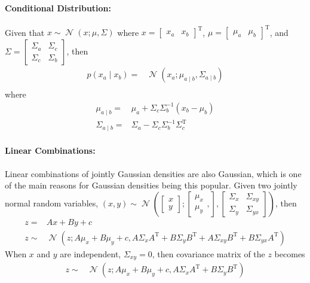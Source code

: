\documentclass[twoside]{article}
\newcommand{\N}{\operatorname{\mathcal{N}}}
\renewcommand{\t}{^\mathrm{T}{}}
\begin{document}
\paragraph{Conditional Distribution:}
Given that $x\sim\N(x;\mu,\Sigma)$ where
$x = \left[\begin{array}{cc}
	x_a & x_b
\end{array} \right]\t$, $
\mu = \left[\begin{array}{cc}
	\mu_a & \mu_b
\end{array} \right]\t $, and $
\Sigma = \left[\begin{array}{cc}
	\Sigma_a & \Sigma_c\\
	\Sigma_c & \Sigma_b
\end{array} \right] $, then
\begin{align*}
	p(x_a\mid x_b) =& \N(x_a;\mu_{a\mid b},\Sigma_{a\mid b})\\
\end{align*}
where
\begin{align*}
	\mu_{a \mid b} =& \mu_a + \Sigma_c \Sigma_b^{-1}(x_b-\mu_b)\\
	\Sigma_{a \mid b} =& \Sigma_a - \Sigma_c\Sigma_b^{-1}\Sigma_c\t 
\end{align*}
\paragraph{Linear Combinations:}
Linear combinations of jointly Gaussian densities are also Gaussian, which is one of the main reasons for Gaussian densities being this popular. Given two jointly normal random variables, $(x,y)\sim\N\left( \left[ \begin{array}{c}
	x\\y
\end{array}\right] ;\left[ \begin{array}{c}
\mu_x\\\mu_y
\end{array},\right],\left[ \begin{array}{cc}
\Sigma_x & \Sigma_{xy}\\ \Sigma_{y} & \Sigma_{yx}
\end{array}\right]\right)   $, then 
\begin{align*}
	z =& Ax+By+c \\
	z \sim& \N(z;A\mu_x+B\mu_y+c,A\Sigma_xA\t+B\Sigma_yB\t+A\Sigma_{xy}B\t+B\Sigma_{yx}A\t)
\end{align*}
When $x$ and $y$ are independent, $\Sigma_{xy}=0$, then covariance matrix of the $z$ becomes
\begin{align*}
	z \sim& \N(z;A\mu_x+B\mu_y+c,A\Sigma_xA\t+B\Sigma_yB\t)
\end{align*}
\end{document}
